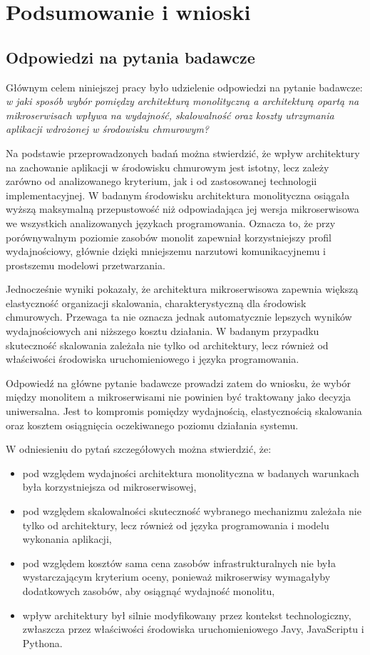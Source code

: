 \chapter{Podsumowanie i wnioski}
\label{chapter:summary}

\section{Odpowiedzi na pytania badawcze}

Głównym celem niniejszej pracy było udzielenie odpowiedzi na pytanie badawcze: \textit{w jaki sposób wybór pomiędzy architekturą monolityczną a architekturą opartą na mikroserwisach wpływa na wydajność, skalowalność oraz koszty utrzymania aplikacji wdrożonej w środowisku chmurowym?}

Na podstawie przeprowadzonych badań można stwierdzić, że wpływ architektury na zachowanie aplikacji w środowisku chmurowym jest istotny, lecz zależy zarówno od analizowanego kryterium, jak i od zastosowanej technologii implementacyjnej. W badanym środowisku architektura monolityczna osiągała wyższą maksymalną przepustowość niż odpowiadająca jej wersja mikroserwisowa we wszystkich analizowanych językach programowania. Oznacza to, że przy porównywalnym poziomie zasobów monolit zapewniał korzystniejszy profil wydajnościowy, głównie dzięki mniejszemu narzutowi komunikacyjnemu i prostszemu modelowi przetwarzania.

Jednocześnie wyniki pokazały, że architektura mikroserwisowa zapewnia większą elastyczność organizacji skalowania, charakterystyczną dla środowisk chmurowych. Przewaga ta nie oznacza jednak automatycznie lepszych wyników wydajnościowych ani niższego kosztu działania. W badanym przypadku skuteczność skalowania zależała nie tylko od architektury, lecz również od właściwości środowiska uruchomieniowego i języka programowania.

Odpowiedź na główne pytanie badawcze prowadzi zatem do wniosku, że wybór między monolitem a mikroserwisami nie powinien być traktowany jako decyzja uniwersalna. Jest to kompromis pomiędzy wydajnością, elastycznością skalowania oraz kosztem osiągnięcia oczekiwanego poziomu działania systemu.

W odniesieniu do pytań szczegółowych można stwierdzić, że:
\begin{itemize}
    \item pod względem wydajności architektura monolityczna w badanych warunkach była korzystniejsza od mikroserwisowej,
    \item pod względem skalowalności skuteczność wybranego mechanizmu zależała nie tylko od architektury, lecz również od języka programowania i modelu wykonania aplikacji,
    \item pod względem kosztów sama cena zasobów infrastrukturalnych nie była wystarczającym kryterium oceny, ponieważ mikroserwisy wymagałyby dodatkowych zasobów, aby osiągnąć wydajność monolitu,
    \item wpływ architektury był silnie modyfikowany przez kontekst technologiczny, zwłaszcza przez właściwości środowiska uruchomieniowego Javy, JavaScriptu i Pythona.
\end{itemize}

